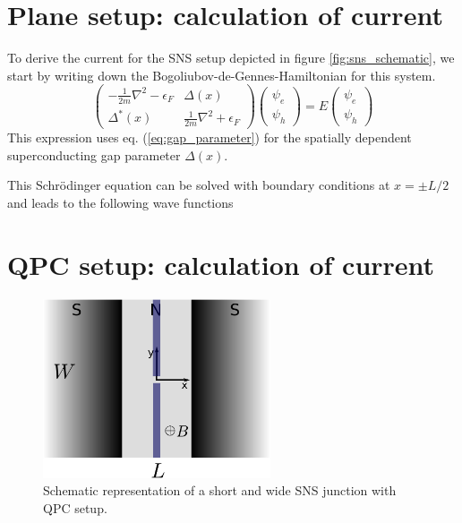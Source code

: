 \section{Plane setup: calculation of current}
To derive the current for the SNS setup depicted in figure \ref{fig:sns_schematic}, we start by writing down the Bogoliubov-de-Gennes-Hamiltonian for this system.
\begin{equation}
\begin{pmatrix}
-\frac{1}{2m} \nabla^2 - \epsilon_F & \Delta(x) \\
\Delta^*(x) & \frac{1}{2m} \nabla^2 + \epsilon_F 
\end{pmatrix}
\begin{pmatrix}
\psi_e \\
\psi_h
\end{pmatrix} = E 
\begin{pmatrix}
\psi_e\\
\psi_h
\end{pmatrix}
\end{equation}
This expression uses eq. (\ref{eq:gap_parameter}) for the spatially dependent superconducting gap parameter $\Delta(x)$.

This Schrödinger equation can be solved with boundary conditions at $x = \pm L/2$ and leads to the following wave functions
\section{QPC setup: calculation of current}
\begin{figure}
\centering
\includegraphics[width=0.6\textwidth]{figure/analyticalmodel/qpc_sns_junction.pdf}
\caption{Schematic representation of a short and wide SNS junction with QPC setup.}
\label{fig:qpc_sns_schematic}
\end{figure}

